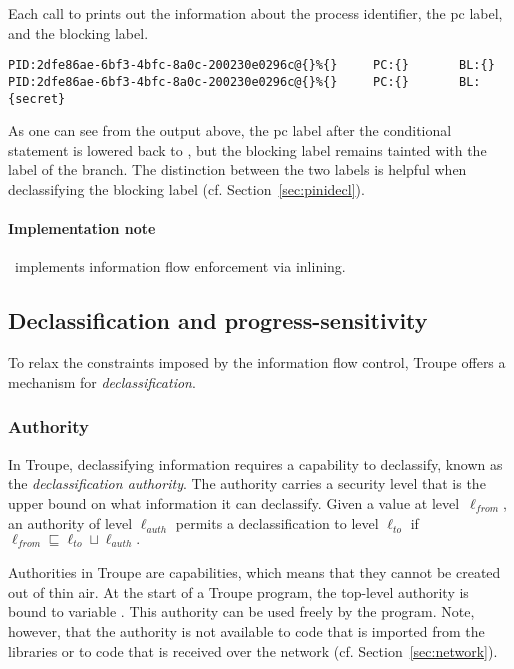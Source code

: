 Each call to  prints out the information about the process identifier,
the pc label, and the blocking label.
\begin{verbatim}
PID:2dfe86ae-6bf3-4bfc-8a0c-200230e0296c@{}%{}     PC:{}       BL:{}                
PID:2dfe86ae-6bf3-4bfc-8a0c-200230e0296c@{}%{}     PC:{}       BL:{secret}           
\end{verbatim}
As one can see from the output above, the pc label after the conditional
statement is lowered back to \lev{}, but the blocking label remains tainted 
with the label of the branch. The distinction between the two labels
is helpful when declassifying the blocking label (cf. Section~\ref{sec:pinidecl}).





\paragraph{Implementation note}
\troupelang\ implements information flow enforcement via inlining.



\subsection{Declassification and progress-sensitivity}
\label{sec:declassification}
To relax the constraints imposed by the information flow control, Troupe offers 
a mechanism for \emph{declassification}. 
\subsubsection{Authority}

In Troupe, declassifying information requires a capability to declassify,
known as the \emph{declassification authority}. 
The authority carries a security level that is the upper bound 
on what information it can declassify. 
%
Given  a value at 
level~$\ell_{\mathit{from}}$, an authority of 
level $\ell_{\mathit{auth}}$ permits a declassification to level 
$\ell_{\mathit{to}}$ if
${\ell_{\mathit{from}}} \sqsubseteq {  \ell_{\mathit{to}} \sqcup \ell_{\mathit{auth}}}.$

Authorities in Troupe are capabilities, which means that they cannot be 
created out of thin air. At the start of a Troupe program, the top-level authority is 
 bound to variable . This authority can be used freely by the program.
Note, however, that the authority is not available to code that is imported 
from the libraries or to code that is received over the network (cf. Section~\ref{sec:network}).


